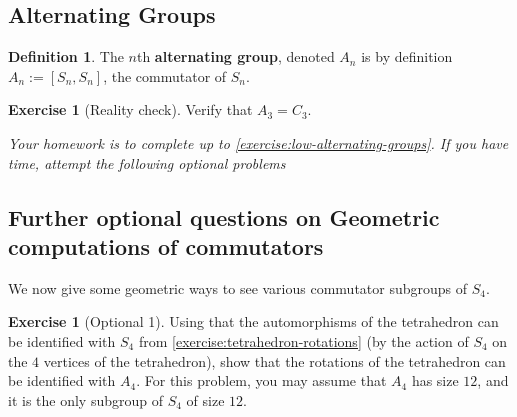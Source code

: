 \documentclass[reqno, 12pt, letter]{article}
\theoremstyle{plain}
\theoremstyle{definition}
\newtheorem{definition}[theorem]{Definition}
\newtheorem{exercise}[theorem]{Exercise}
\theoremstyle{remark}
\numberwithin{equation}{section}
\begin{document}

\subsection{Alternating Groups}

\begin{definition}
	\label{definition:alternating}
	The $n$th {\bf alternating group}, denoted $A_n$ is by definition $A_n := \left[ S_n, S_n \right]$, the commutator of $S_n$.
\end{definition}
\begin{exercise}[Reality check]
	\label{exercise:low-alternating-groups}
	Verify that $A_3 = C_3$.	
\end{exercise}

{\it Your homework is to complete up to \autoref{exercise:low-alternating-groups}. If you have time, attempt the following optional 
problems}

\subsection{Further optional questions on Geometric computations of commutators}
We now give some geometric ways to see various commutator subgroups of $S_4$.
\begin{exercise}[Optional 1]
	\label{exercise:}
	Using that the automorphisms of the tetrahedron can be identified with $S_4$ from \autoref{exercise:tetrahedron-rotations} (by the action of
	$S_4$ on the $4$ vertices of the tetrahedron), 
	show that the rotations of the tetrahedron can be identified with $A_4$. For this problem, you may assume that $A_4$ has size $12$, and
		it is the only subgroup of $S_4$ of size $12$.
\end{exercise}
\end{document}
